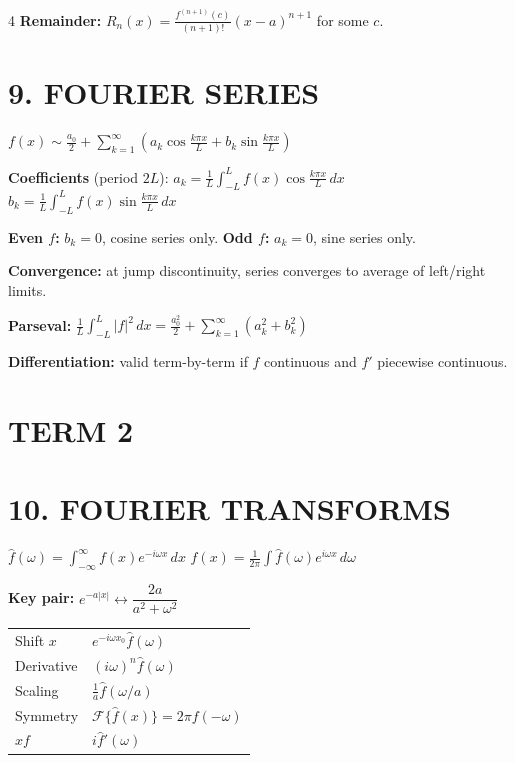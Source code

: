 \documentclass[8pt,a4paper,landscape]{extarticle}
\newcommand{\dx}{\,dx}
\begin{document}
\begin{multicols}{4}
\textbf{Remainder:} $R_n(x)=\frac{f^{(n+1)}(c)}{(n+1)!}(x-a)^{n+1}$ for some $c$.

\section*{9. FOURIER SERIES}

$f(x)\sim\frac{a_0}{2}+\sum_{k=1}^\infty\left(a_k\cos\frac{k\pi x}{L}+b_k\sin\frac{k\pi x}{L}\right)$

\textbf{Coefficients} (period $2L$):
$a_k=\frac{1}{L}\int_{-L}^L f(x)\cos\frac{k\pi x}{L}\dx$\quad
$b_k=\frac{1}{L}\int_{-L}^L f(x)\sin\frac{k\pi x}{L}\dx$

\textbf{Even $f$:} $b_k=0$, cosine series only.
\textbf{Odd $f$:} $a_k=0$, sine series only.

\textbf{Convergence:} at jump discontinuity, series converges to average of left/right limits.

\textbf{Parseval:} $\frac{1}{L}\int_{-L}^L|f|^2\dx=\frac{a_0^2}{2}+\sum_{k=1}^\infty(a_k^2+b_k^2)$

\textbf{Differentiation:} valid term-by-term if $f$ continuous and $f'$ piecewise continuous.

\section*{TERM 2}

\section*{10. FOURIER TRANSFORMS}

$\hat f(\omega)=\int_{-\infty}^\infty f(x)e^{-i\omega x}\dx$\quad
$f(x)=\frac{1}{2\pi}\int\hat f(\omega)e^{i\omega x}\,d\omega$

\textbf{Key pair:} $e^{-a|x|}\leftrightarrow\dfrac{2a}{a^2+\omega^2}$

\begin{tabular}{@{}ll@{}}
Shift $x$ & $e^{-i\omega x_0}\hat f(\omega)$ \\
Derivative & $(i\omega)^n\hat f(\omega)$ \\
Scaling & $\frac{1}{a}\hat f(\omega/a)$ \\
Symmetry & $\mathcal{F}\{\hat f(x)\}=2\pi f(-\omega)$ \\
$xf$ & $i\hat f'(\omega)$ \\
\end{tabular}


\end{multicols}
\end{document}

